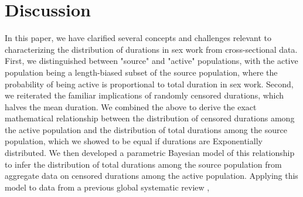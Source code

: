 \section{Discussion}\label{disc}
\par %
In this paper, we have clarified several concepts and challenges relevant to
characterizing the distribution of durations in sex work from cross-sectional data.
First, we distinguished between "source" and "active" populations,
with the active population being a length-biased subset of the source population,
where the probability of being active is proportional to total duration in sex work.
Second, we reiterated the familiar implications of randomly censored durations,
which halves the mean duration.
We combined the above to derive the exact mathematical relationship between
the distribution of censored durations among the active population and
the distribution of total durations among the source population,
which we showed to be equal if durations are Exponentially distributed.
We then developed a parametric Bayesian model of this relationship
to infer the distribution of total durations among the source population
from aggregate data on censored durations among the active population.
Applying this model to data from a previous global systematic review \cite{Fazito2012},
